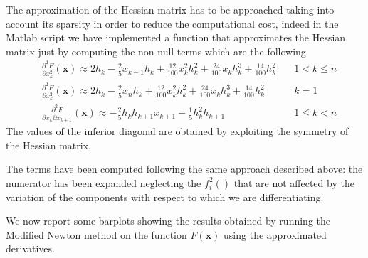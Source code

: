The approximation of the Hessian matrix has to be approached taking into account its sparsity in order to reduce the computational cost, indeed in the Matlab script we have implemented a function that approximates the Hessian matrix just by computing the non-null terms which are the following
\begin{align*}
    & \frac{\partial^2 F}{\partial x_k^2} (\mathbf{x})  \approx 2h_k - \frac{2}{5} x_{k-1} h_k + \frac{12}{100} x_k^2 h_k^2 + \frac{24}{100}x_k h_k^3 + \frac{14}{100} h_k^2 \quad & 1 < k \leq n \\
    & \frac{\partial^2 F}{\partial x_k^2} (\mathbf{x})  \approx 2h_k - \frac{2}{5} x_{n} h_k + \frac{12}{100} x_k^2 h_k^2 + \frac{24}{100}x_k h_k^3 + \frac{14}{100} h_k^2 \quad  & k = 1 \\
    & \frac{\partial^2 F}{\partial x_k \partial x_{k+1}} (\mathbf{x})  \approx - \frac{2}{5} h_k h_{k+1} x_{k+1} - \frac{1}{5} h_k^2 h_{k+1} \quad & 1 \leq k < n 
\end{align*}
The values of the inferior diagonal are obtained by exploiting the symmetry of the Hessian matrix.

The terms have been computed following the same approach described above: the numerator has been expanded neglecting the $f_i^2()$ that are not affected by the variation of the components with respect to which we are differentiating.


We now report some barplots showing the results obtained by running the Modified Newton method on the function $F(\mathbf{x})$ using the approximated derivatives.

